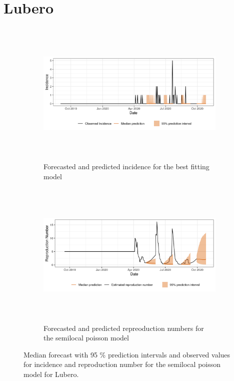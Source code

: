  \section{ Lubero }\begin{figure}[H]\begin{subfigure}{\textwidth}  \centering  \includegraphics[width=0.9\linewidth, height=7cm]{../output/Lubero_predictions.png}  \caption{Forecasted and predicted incidence for the best fitting model}\end{subfigure}

\begin{subfigure}{\textwidth}  \centering  \includegraphics[width=0.9\linewidth, height=7cm]{../output/Lubero_Rs.png}  \caption{Forecasted and predicted repreoduction numbers for the semilocal poisson model}\end{subfigure}  \caption{Median forecast with 95 \% prediction intervals and observed values for incidence and reproduction number for the semilocal poisson model for Lubero.}\end{figure}

